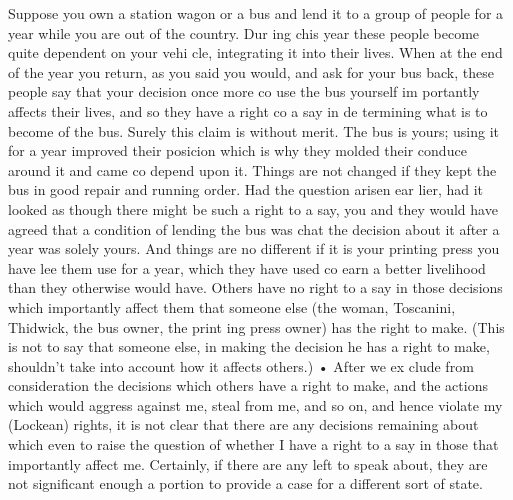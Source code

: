 \documentclass[11pt,openany]{book}
\begin{document}
Suppose you own a station wagon or a bus and lend it to a group of people for a year while you are out of the country. Dur ing chis year these people become quite dependent on your vehi cle, integrating it into their lives. When at the end of the year you return, as you said you would, and ask for your bus back, these people say that your decision once more co use the bus yourself im portantly affects their lives, and so they have a right co a say in de termining what is to become of the bus. Surely this claim is without merit. The bus is yours; using it for a year improved their posicion which is why they molded their conduce around it and came co depend upon it. Things are not changed if they kept the bus in good repair and running order. Had the question arisen ear lier, had it looked as though there might be such a right to a say, you and they would have agreed that a condition of lending the bus was chat the decision about it after a year was solely yours. And things are no different if it is your printing press you have lee them use for a year, which they have used co earn a better livelihood than they otherwise would have. Others have no right to a say in those decisions which importantly affect them that someone else (the woman, Toscanini, Thidwick, the bus owner, the print ing press owner) has the right to make. (This is not to say that someone else, in making the decision he has a right to make, shouldn't take into account how it affects others.) • After we ex clude from consideration the decisions which others have a right to make, and the actions which would aggress against me, steal from me, and so on, and hence violate my (Lockean) rights, it is not clear that there are any decisions remaining about which even to raise the question of whether I have a right to a say in those that importantly affect me. Certainly, if there are any left to speak about, they are not significant enough a portion to provide a case for a different sort of state. 
\end{document}
